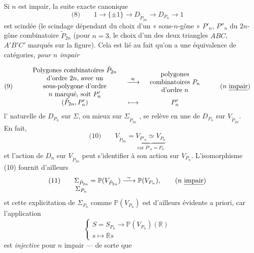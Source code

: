 \documentclass[11pt,a4paper]{article}
\begin{document}
Si $n$ est impair, la suite exacte canonique
\[
  \text{(8)}\qquad 1 \longrightarrow \{\pm 1\} \longrightarrow D_{\tilde P_{2n}} \longrightarrow D_{P_n} \longrightarrow 1
\]
est scindée \struck{\ill{}} (le scindage  dépendant du choix d'un « sous-$n$-gône »  $P'_n$, $P''_n$ du $2n$-gône combinatoire $\tilde P_{2n}$ (pour $n = 3$, le choix d'un des deux triangles $ABC$, $A'B'C'$ marqués sur la figure). Cela est lié au fait qu'on a une équivalence de catégories, \emph{pour $n$ impair}

\[
  \text{(9)}\qquad
  \begin{array}{ccc}
    \begin{array}{c}\text{Polygones combinatoires $\tilde P_{2n}$}\\ \text{d'ordre $2n$, avec un}\\ \text{sous-polygone d'ordre}\\ \text{$n$ marqué, soit $P'_n$}\end{array}
    & \xrightarrow{\ \approx\ } &
    \begin{array}{c}\text{polygones}\\ \text{combinatoires $P_n$}\\ \text{d'ordre $n$}\end{array} \\[2pt]
    (\tilde P_{2n}, P'_n) & \longmapsto & P'_n
  \end{array}
  \qquad (n \text{ \emph{impair}})
\]
 l'  naturelle de $D_{P_n}$ sur $\Sigma$, ou mieux sur $\Sigma_{\tilde P_{2n}}$ , se relève en une   de $D_{P_n}$ sur $V_{\tilde P_{2n}}$. En fait,  
\[
  \text{(10)}\qquad V_{\tilde P_{2n}} = \underbrace{V_{P'_n} \simeq V_{P_n}}_{\text{car } P'_n \simeq P_n}
\]
et l'action de $D_n$ sur $V_{\tilde P_{2n}}$ peut s'identifier à son action sur $V_{P_n}$.  L'isomorphisme (10) fournit d'ailleurs
\[
  \text{(11)}\qquad \underset{\textstyle \Sigma_{P_n}}{\Sigma_{\tilde P_{2n}}} = \mathbb{P}(V_{\tilde P_{2n}}) \xrightarrow{\ \sim\ } \mathbb{P}(V_{P_n}) , \qquad (n \text{ \emph{impair}})
\]
 et cette explicitation de $\Sigma_{P_n}$ comme $\mathbb{P}(V_{P_n})$ est \struck{\ill{}} d'ailleurs évidente a priori, car l'application
\[
  \begin{cases}
    S = S_{P_n} \longrightarrow \mathbb{P}(V_{P_n})(\mathbb{R}) \\
    s \longmapsto \mathbb{R}s
  \end{cases}
\]
est \emph{injective} pour $n$ impair — de sorte que
\end{document}
